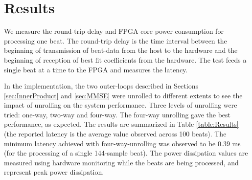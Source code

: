 \documentclass[conference]{IEEEtran}
\begin{document}
%
%
%
%

\section{Results}\label{s:results}

We measure the round-trip delay and FPGA core power consumption for processing one beat. 
The round-trip delay is the time interval between the beginning of transmission of 
beat-data from the host to the hardware and the beginning of reception of best fit
coefficients from the hardware. 
The test feeds a single beat at a time to the FPGA and measures the latency.

In the implementation, the two outer-loops described in Sections \ref{sec:InnerProduct} and
 \ref{sec:MMSE} were unrolled to different
extents to see the impact of unrolling on the system performance. 
Three levels of unrolling were tried: one-way, two-way and four-way.  
The four-way unrolling gave the best performance,
as expected.  The results are summarized in Table \ref{table:Results} (the reported latency
is the average value observed across 100 beats).  
The minimum latency achieved with four-way-unrolling was observed to be
$0.39$ ms (for the processing of a single 144-sample beat).
The power dissipation values are
measured using hardware monitoring while the beats are being processed, and represent peak
power dissipation.
\end{document}
